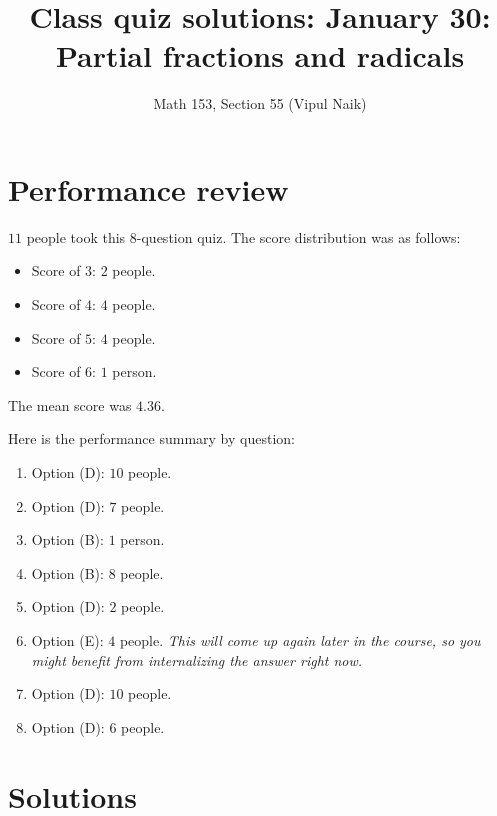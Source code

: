 \documentclass[10pt]{amsart}
\title{Class quiz solutions: January 30: Partial fractions and radicals}
\author{Math 153, Section 55 (Vipul Naik)}
\begin{document}
\maketitle

\section{Performance review}

$11$ people took this $8$-question quiz. The score distribution was as follows:

\begin{itemize}
\item Score of $3$: $2$ people.
\item Score of $4$: $4$ people.
\item Score of $5$: $4$ people.
\item Score of $6$: $1$ person.
\end{itemize}

The mean score was $4.36$.

Here is the performance summary by question:

\begin{enumerate}
\item Option (D): $10$ people.
\item Option (D): $7$ people.
\item Option (B): $1$ person.
\item Option (B): $8$ people.
\item Option (D): $2$ people.
\item Option (E): $4$ people. {\em This will come up again later in
  the course, so you might benefit from internalizing the answer right
  now.}
\item Option (D): $10$ people.
\item Option (D): $6$ people.
\end{enumerate}

\section{Solutions}
\end{document}
